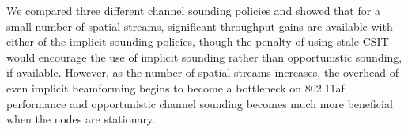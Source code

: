  We compared three different channel sounding policies and showed that for a small number of spatial streams, significant throughput gains are available with either of the implicit sounding policies, though the penalty of using stale \ac{CSIT} would encourage the use of implicit sounding rather than opportunistic sounding, if available.
 However, as the number of spatial streams increases, the overhead of even implicit beamforming begins to become a bottleneck on 802.11af performance and opportunistic channel sounding becomes much more beneficial when the nodes are stationary.

